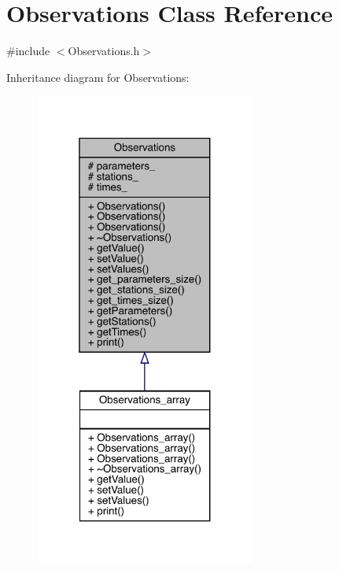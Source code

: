 \hypertarget{class_observations}{}\section{Observations Class Reference}
\label{class_observations}


{\ttfamily \#include $<$Observations.\+h$>$}



Inheritance diagram for Observations\+:
\nopagebreak
\begin{figure}[H]
\begin{center}
\leavevmode
\includegraphics[width=205pt]{class_observations__inherit__graph}
\end{center}
\end{figure}



